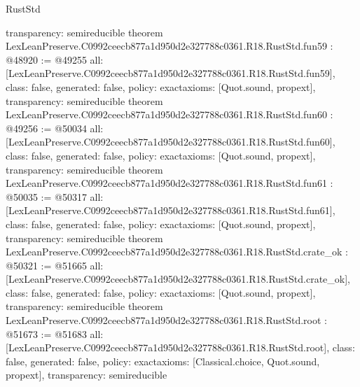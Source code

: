 \begin{lexlean}{RustStd}
\begin{coremodule}
{  transparency: semireducible
}
theorem LexLeanPreserve.C0992ceecb877a1d950d2e327788c0361.R18.RustStd.fun59 : @48920 := @49255 {
  all: [LexLeanPreserve.C0992ceecb877a1d950d2e327788c0361.R18.RustStd.fun59],
  class: false,
  generated: false,
  policy: exact{axioms: [Quot.sound, propext]},
  transparency: semireducible
}
theorem LexLeanPreserve.C0992ceecb877a1d950d2e327788c0361.R18.RustStd.fun60 : @49256 := @50034 {
  all: [LexLeanPreserve.C0992ceecb877a1d950d2e327788c0361.R18.RustStd.fun60],
  class: false,
  generated: false,
  policy: exact{axioms: [Quot.sound, propext]},
  transparency: semireducible
}
theorem LexLeanPreserve.C0992ceecb877a1d950d2e327788c0361.R18.RustStd.fun61 : @50035 := @50317 {
  all: [LexLeanPreserve.C0992ceecb877a1d950d2e327788c0361.R18.RustStd.fun61],
  class: false,
  generated: false,
  policy: exact{axioms: [Quot.sound, propext]},
  transparency: semireducible
}
theorem LexLeanPreserve.C0992ceecb877a1d950d2e327788c0361.R18.RustStd.crate_ok : @50321 := @51665 {
  all: [LexLeanPreserve.C0992ceecb877a1d950d2e327788c0361.R18.RustStd.crate_ok],
  class: false,
  generated: false,
  policy: exact{axioms: [Quot.sound, propext]},
  transparency: semireducible
}
theorem LexLeanPreserve.C0992ceecb877a1d950d2e327788c0361.R18.RustStd.root : @51673 := @51683 {
  all: [LexLeanPreserve.C0992ceecb877a1d950d2e327788c0361.R18.RustStd.root],
  class: false,
  generated: false,
  policy: exact{axioms: [Classical.choice, Quot.sound, propext]},
  transparency: semireducible
}


\end{coremodule}
\end{lexlean}
